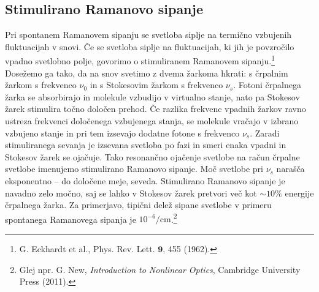 \subsection*{Stimulirano Ramanovo sipanje}
Pri spontanem Ramanovem sipanju se svetloba siplje na termično vzbujenih fluktuacijah
v snovi. Če se svetloba siplje na fluktuacijah, ki jih je povzročilo vpadno
svetlobno polje, govorimo o stimuliranem Ramanovem sipanju.\footnote{G. Eckhardt et al., Phys. Rev. Lett.
$\mathbf{9}$, 455 (1962).} Dosežemo ga tako, da na snov svetimo z dvema žarkoma hkrati: 
s črpalnim žarkom s frekvenco $\nu_0$ in s Stokesovim žarkom s frekvenco $\nu_s$. 
Fotoni črpalnega žarka se absorbirajo in molekule vzbudijo v virtualno stanje, nato pa 
Stokesov žarek stimulira točno določen prehod. Če razlika frekvenc vpadnih 
žarkov ravno ustreza frekvenci določenega vzbujenega stanja, se  molekule vračajo
v izbrano vzbujeno stanje in pri tem izsevajo dodatne fotone s frekvenco $\nu_s$. Zaradi
stimuliranega sevanja je izsevana svetloba po fazi in smeri enaka vpadni in Stokesov
žarek se ojačuje. Tako resonančno ojačenje svetlobe na račun črpalne svetlobe imenujemo stimulirano  
Ramanovo sipanje. Moč svetlobe pri $\nu_s$  narašča eksponentno -- do določene meje, seveda.
Stimulirano Ramanovo sipanje je navadno zelo močno, saj se lahko v Stokesov žarek pretvori 
več kot $\sim 10\%$ energije črpalnega žarka. Za primerjavo, tipični delež sipane svetlobe v primeru 
spontanega Ramanovega sipanja je $10^{-6}/\si{\centi\meter}$.\footnote{Glej npr. 
G. New, {\it Introduction to Nonlinear Optics}, Cambridge University Press (2011).}

